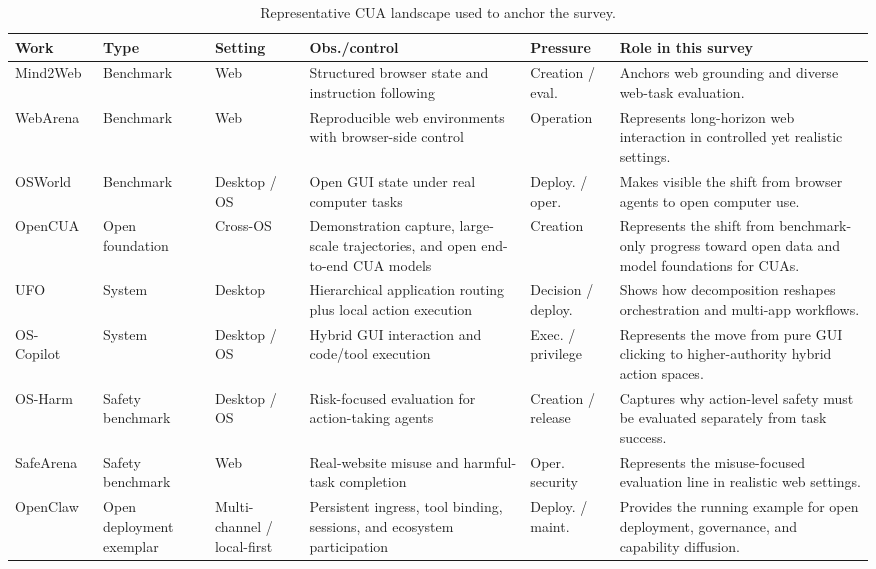 \begin{table}[!t]
\centering
\scriptsize
\caption{Representative CUA landscape used to anchor the survey.}
\label{tab:representative_landscape}
\setlength{\tabcolsep}{3.5pt}
\renewcommand{\arraystretch}{1.08}
\begin{tabularx}{\textwidth}{L{1.95cm}L{1.45cm}L{1.55cm}L{2.75cm}L{1.75cm}Y}
\toprule
\textbf{Work} & \textbf{Type} & \textbf{Setting} &
\textbf{Obs./control} & \textbf{Pressure} &
\textbf{Role in this survey} \\
\midrule
Mind2Web~\cite{deng2023mind2web} & Benchmark & Web &
Structured browser state and instruction following & Creation / eval. &
Anchors web grounding and diverse web-task evaluation. \\
WebArena~\cite{zhou2023webarena} & Benchmark & Web &
Reproducible web environments with browser-side control & Operation &
Represents long-horizon web interaction in controlled yet realistic settings. \\
OSWorld~\cite{xie2024osworld} & Benchmark & Desktop / OS &
Open GUI state under real computer tasks & Deploy. / oper. &
Makes visible the shift from browser agents to open computer use. \\
OpenCUA~\cite{wang2025opencua} & Open foundation & Cross-OS &
Demonstration capture, large-scale trajectories, and open end-to-end CUA models & Creation &
Represents the shift from benchmark-only progress toward open data and model foundations for CUAs. \\
UFO~\cite{zhang2025ufo} & System & Desktop &
Hierarchical application routing plus local action execution & Decision / deploy. &
Shows how decomposition reshapes orchestration and multi-app workflows. \\
OS-Copilot~\cite{wu2024copilot} & System & Desktop / OS &
Hybrid GUI interaction and code/tool execution & Exec. / privilege &
Represents the move from pure GUI clicking to higher-authority hybrid action spaces. \\
OS-Harm~\cite{kuntz2025harm} & Safety benchmark & Desktop / OS &
Risk-focused evaluation for action-taking agents & Creation / release &
Captures why action-level safety must be evaluated separately from task success. \\
SafeArena~\cite{tur2025safearena} & Safety benchmark & Web &
Real-website misuse and harmful-task completion & Oper. security &
Represents the misuse-focused evaluation line in realistic web settings. \\
OpenClaw~\cite{openclaw2026website,ibm2026openclaw} & Open deployment exemplar & Multi-channel / local-first &
Persistent ingress, tool binding, sessions, and ecosystem participation & Deploy. / maint. &
Provides the running example for open deployment, governance, and capability diffusion. \\
\bottomrule
\end{tabularx}
\end{table}

